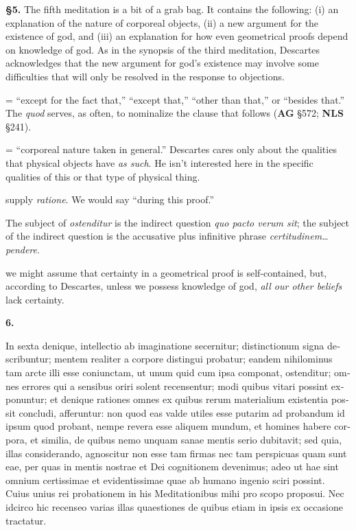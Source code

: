 \prenotes

\textbf{§5.} The fifth meditation is a bit of a grab bag. It contains the following: (i) an explanation of the nature of corporeal objects, (ii) a new argument for the existence of god, and (iii) an explanation for how even geometrical proofs depend on knowledge of god. As in the synopsis of the third meditation, Descartes acknowledges that the new argument for god's existence may involve some difficulties that will only be resolved in the response to objections.

 = ``except for the fact that,'' ``except that,'' ``other than that,'' or ``besides that.'' The \textit{quod} serves, as often, to nominalize the clause that follows (\textbf{AG} §572; \textbf{NLS} §241). 

 = ``corporeal nature taken in general.'' Descartes cares only about the qualities that physical objects have \textit{as such}. He isn't interested here in the specific qualities of this or that type of physical thing.

 supply \textit{ratione}. We would say ``during this proof.''

 The subject of \textit{ostenditur} is the indirect question \textit{quo pacto verum sit}; the subject of the indirect question is the accusative plus infinitive phrase \textit{certitudinem\dots pendere}.

 we might assume that certainty in a geometrical proof is self-contained, but, according to Descartes, unless we possess knowledge of god, \textit{all our other beliefs} lack certainty.


\clearpage

\beginnumbering
\pstart
\textbf{6.} \begin{latin}In sexta denique, intellectio ab imaginatione secernitur; distinctionum signa describuntur; mentem realiter a corpore distingui probatur; eandem nihilominus tam arcte illi esse coniunctam, ut unum quid cum ipsa componat, ostenditur; omnes errores qui a sensibus oriri solent recensentur; modi quibus vitari possint exponuntur; et denique rationes omnes ex quibus rerum materialium existentia possit concludi, afferuntur: non quod eas valde utiles esse putarim ad probandum id ipsum quod  probant, nempe revera esse aliquem mundum, et homines habere corpora, et similia, de quibus nemo unquam sanae mentis serio dubitavit; sed quia, illas considerando, agnoscitur non esse tam firmas nec tam perspicuas quam sunt eae, per quas in mentis nostrae et Dei cognitionem devenimus; adeo ut hae sint omnium certissimae et evidentissimae quae ab humano ingenio sciri possint. Cuius unius rei probationem in his Meditationibus mihi pro scopo proposui. Nec idcirco hic recenseo varias illas quaestiones de quibus etiam in ipsis ex occasione tractatur.\end{latin}
\pend
\endnumbering

